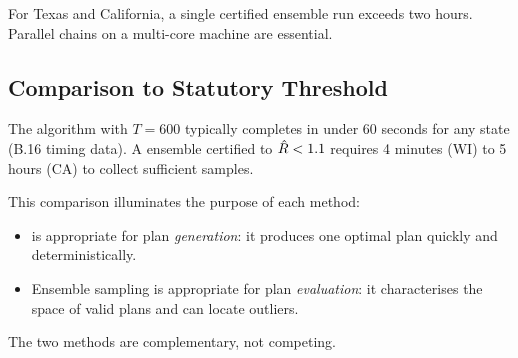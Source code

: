For Texas and California, a single certified ensemble run exceeds two hours.
Parallel chains on a multi-core machine are essential.

\subsection{Comparison to Statutory Threshold}

The \cs{} algorithm with $T = 600$ typically completes in under 60 seconds
for any state (B.16 timing data).
A \recom{} ensemble certified to $\hat{R} < 1.1$ requires 4 minutes (WI) to
5 hours (CA) to collect sufficient samples.

This comparison illuminates the purpose of each method:
\begin{itemize}
\item \cs{} is appropriate for plan \emph{generation}: it produces one
      optimal plan quickly and deterministically.
\item Ensemble sampling is appropriate for plan \emph{evaluation}: it
      characterises the space of valid plans and can locate outliers.
\end{itemize}

The two methods are complementary, not competing.
